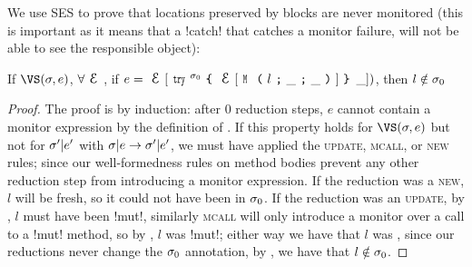We use SES to prove that locations preserved by \Q@try@ blocks are never monitored (this is important as it means that a \Q!catch! that catches a monitor failure, will not be able to see the responsible object):%
\SS\begin{Lemma}\rm
	If $\VS(\s, e)$, $\forall \E$, if $e = \E[\Kw{try}^{\s_0}\oC\E[\M{l}{\_}{\_}]\cC\,\_])$, then $l\notin\sigma_0$
\end{Lemma}\SS
\begin{proof}
The proof is by induction: after 0 reduction steps, $e$ cannot contain a monitor expression by the definition of \VS. If this property holds for $\VS(\s, e)$ but not for $\sigma'|e'$ with $\sigma|e\rightarrow \sigma'|e'$, we must have applied the \textsc{update}, \textsc{mcall}, or \textsc{new} rules; since our well-formedness rules on method bodies prevent any other reduction step from introducing a monitor expression. If the reduction was a \textsc{new}, $l$ will be fresh, so it could not have been in $\sigma_0$. If the reduction was an \textsc{update}, by , $l$ must have been \Q!mut!, similarly \textsc{mcall} will only introduce a monitor over a call to a \Q!mut! method, so by , $l$ was \Q!mut!; either way we have that $l$ was \muty, since our reductions never change the $\sigma_0$ annotation, by , we have that $l \notin \sigma_0$.
\end{proof}

